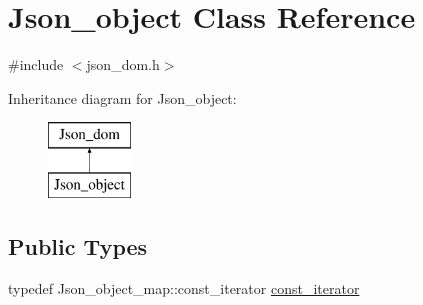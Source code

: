 \hypertarget{classJson__object}{}\section{Json\+\_\+object Class Reference}
\label{classJson__object}


{\ttfamily \#include $<$json\+\_\+dom.\+h$>$}

Inheritance diagram for Json\+\_\+object\+:\begin{figure}[H]
\begin{center}
\leavevmode
\includegraphics[height=2.000000cm]{classJson__object}
\end{center}
\end{figure}
\subsection*{Public Types}
\begin{DoxyCompactItemize}
\item 
typedef Json\+\_\+object\+\_\+map\+::const\+\_\+iterator \mbox{\hyperlink{classJson__object_a318e93bc476422e10673ec7471062eca}{const\+\_\+iterator}}
\end{DoxyCompactItemize}
